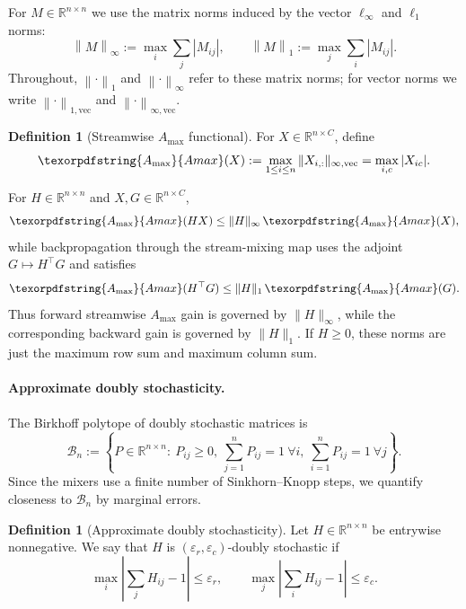 \documentclass[10pt]{article}
\numberwithin{equation}{section}
\theoremstyle{plain}
\theoremstyle{definition}
\newtheorem{definition}[theorem]{Definition}
\theoremstyle{remark}
\newcommand{\R}{\mathbb{R}}
\newcommand{\cB}{\mathcal{B}}
\newcommand{\norm}[1]{\left\lVert #1 \right\rVert}
\newcommand{\Amax}{\texorpdfstring{\ensuremath{A_{\max}}}{Amax}\xspace}
\begin{document}
For $M\in\R^{n\times n}$ we use the matrix norms induced by the vector
$\ell_\infty$ and $\ell_1$ norms:
\begin{equation}\label{eq:induced_norms}
\norm{M}_\infty := \max_i\sum_j |M_{ij}|,
\qquad
\norm{M}_1 := \max_j\sum_i |M_{ij}|.
\end{equation}
Throughout, $\norm{\cdot}_1$ and $\norm{\cdot}_\infty$ refer to these matrix
norms; for vector norms we write $\norm{\cdot}_{1,\mathrm{vec}}$ and
$\norm{\cdot}_{\infty,\mathrm{vec}}$.

\begin{definition}[Streamwise \Amax functional]\label{def:amax-func}
For $X\in\R^{n\times C}$, define
\begin{equation}
\Amax(X):=\max_{1\le i\le n}\|X_{i,:}\|_{\infty,\mathrm{vec}}
=\max_{i,c}|X_{ic}|.
\end{equation}
\end{definition}
For $H\in\R^{n\times n}$ and $X,G\in\R^{n\times C}$,
\begin{equation}\label{eq:amax-norm-link-forward}
\Amax(HX)\le \|H\|_\infty\,\Amax(X),
\end{equation}
while backpropagation through the stream-mixing map uses the adjoint
$G\mapsto H^\top G$ and satisfies
\begin{equation}\label{eq:amax-norm-link-backward}
\Amax(H^\top G)\le \|H\|_1\,\Amax(G).
\end{equation}
Thus forward streamwise \Amax gain is governed by $\|H\|_\infty$, while the
corresponding backward gain is governed by $\|H\|_1$. If $H\ge0$, these norms are
just the maximum row sum and maximum column sum.

\paragraph{Approximate doubly stochasticity.}
The Birkhoff polytope of doubly stochastic matrices is
\begin{equation}\label{eq:birkhoff}
\cB_n
:=
\left\{P\in\R^{n\times n}:\ P_{ij}\ge 0,\
\sum_{j=1}^n P_{ij}=1\ \forall i,\
\sum_{i=1}^n P_{ij}=1\ \forall j
\right\}.
\end{equation}
Since the mixers use a finite number of Sinkhorn--Knopp steps, we quantify
closeness to $\cB_n$ by marginal errors.

\begin{definition}[Approximate doubly stochasticity]\label{def:approx}
Let $H\in\R^{n\times n}$ be entrywise nonnegative. We say that $H$ is
$(\varepsilon_r,\varepsilon_c)$-doubly stochastic if
\begin{equation}\label{eq:approx}
\max_i\left|\sum_j H_{ij}-1\right|\le \varepsilon_r,
\qquad
\max_j\left|\sum_i H_{ij}-1\right|\le \varepsilon_c.
\end{equation}
\end{definition}
\end{document}
